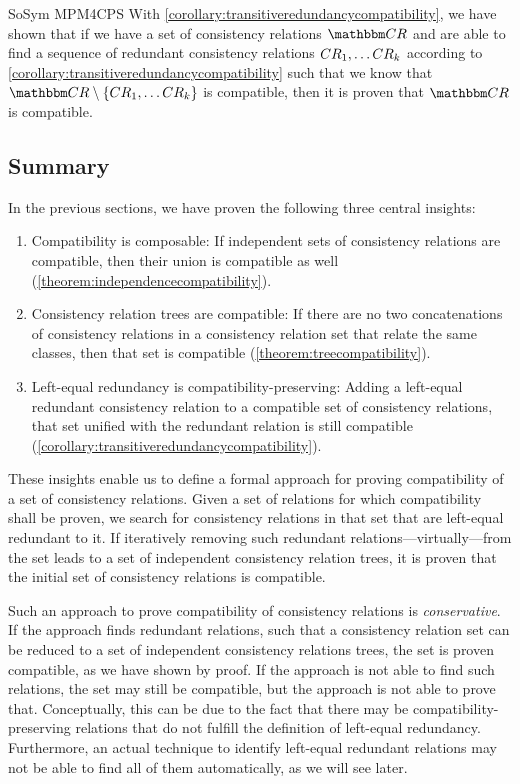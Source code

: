 \begin{copiedFrom}{SoSym MPM4CPS}
With \autoref{corollary:transitiveredundancycompatibility}, we have shown that if we have a set of consistency relations $\consistencyrelationset{CR}$ and are able to find a sequence of redundant consistency relations $CR_{1}, \dots {CR_{k}}$ according to \autoref{corollary:transitiveredundancycompatibility} such that we know that $\consistencyrelationset{CR} \setminus \setted{ \consistencyrelation{CR}{1}, \dots {\consistencyrelation{CR}{k}}}$ is compatible, then it is proven that $\consistencyrelationset{CR}$ is compatible.



\subsection{Summary}
\label{sec:formalapproach:summary}

In the previous sections, we have proven the following three central insights:
\begin{enumerate}
    \item Compatibility is composable: If independent sets of consistency relations are compatible, then their union is compatible as well (\autoref{theorem:independencecompatibility}).
    \item Consistency relation trees are compatible: If there are no two concatenations of consistency relations in a consistency relation set that relate the same classes, then that set is compatible (\autoref{theorem:treecompatibility}).
    \item Left-equal redundancy is compatibility-preserving: Adding a left-equal redundant consistency relation to a compatible set of consistency relations, that set unified with the redundant relation is still compatible (\autoref{corollary:transitiveredundancycompatibility}).
\end{enumerate}

These insights enable us to define a formal approach for proving compatibility of a set of consistency relations.
Given a set of relations for which compatibility shall be proven, we search for consistency relations in that set that are left-equal redundant to it.
If iteratively removing such redundant relations---virtually---from the set leads to a set of independent consistency relation trees, it is proven that the initial set of consistency relations is compatible.

Such an approach to prove compatibility of consistency relations is \emph{conservative}.
If the approach finds redundant relations, such that a consistency relation set can be reduced to a set of independent consistency relations trees, the set is proven compatible, as we have shown by proof.
If the approach is not able to find such relations, the set may still be compatible, but the approach is not able to prove that.
Conceptually, this can be due to the fact that there may be compatibility-preserving relations that do not fulfill the definition of left-equal redundancy.
Furthermore, an actual technique to identify left-equal redundant relations may not be able to find all of them automatically, as we will see later.


\end{copiedFrom}
